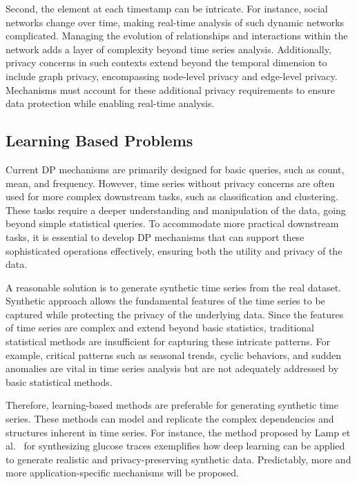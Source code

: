 Second, the element at each timestamp can be intricate. For instance, social networks change over time, making real-time analysis of such dynamic networks complicated. Managing the evolution of relationships and interactions within the network adds a layer of complexity beyond time series analysis. Additionally, privacy concerns in such contexts extend beyond the temporal dimension to include graph privacy, encompassing node-level privacy and edge-level privacy. Mechanisms must account for these additional privacy requirements to ensure data protection while enabling real-time analysis. 

\subsection{Learning Based Problems}
Current DP mechanisms are primarily designed for basic queries, such as count, mean, and frequency. However, time series without privacy concerns are often used for more complex downstream tasks, such as classification and clustering. These tasks require a deeper understanding and manipulation of the data, going beyond simple statistical queries. To accommodate more practical downstream tasks, it is essential to develop DP mechanisms that can support these sophisticated operations effectively, ensuring both the utility and privacy of the data.

A reasonable solution is to generate synthetic time series from the real dataset. Synthetic approach allows the fundamental features of the time series to be captured while protecting the privacy of the underlying data. Since the features of time series are complex and extend beyond basic statistics, traditional statistical methods are insufficient for capturing these intricate patterns. For example, critical patterns such as seasonal trends, cyclic behaviors, and sudden anomalies are vital in time series analysis but are not adequately addressed by basic statistical methods.

Therefore, learning-based methods are preferable for generating synthetic time series. These methods can model and replicate the complex dependencies and structures inherent in time series. For instance, the method proposed by Lamp et al.~\cite{lamp2024glucosynth} for synthesizing glucose traces exemplifies how deep learning can be applied to generate realistic and privacy-preserving synthetic data. Predictably, more and more application-specific mechanisms will be proposed. 


